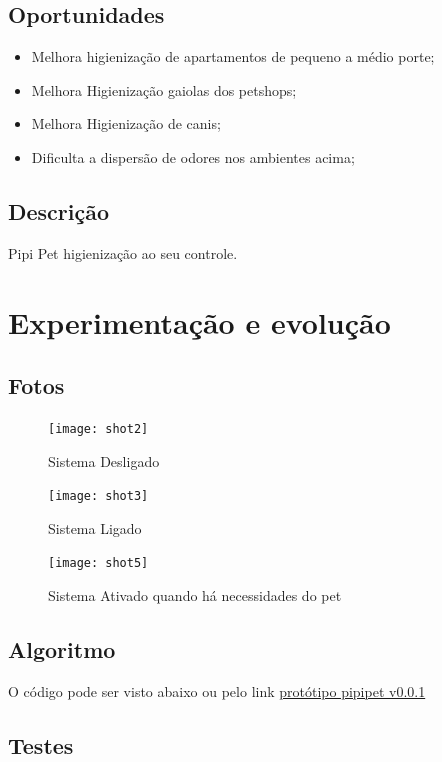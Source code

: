 \documentclass[12pt,a4paper]{article}
\let\oldsection\section
\renewcommand\section{\clearpage\oldsection}
\begin{document}
\subsection{Oportunidades}
\begin{itemize}
	\item Melhora higienização de apartamentos de pequeno a médio porte;
	\item Melhora Higienização gaiolas dos petshops;
	\item Melhora Higienização de canis;
	\item Dificulta a dispersão de odores nos ambientes acima;
\end{itemize}

\subsection{Descrição}
Pipi Pet higienização ao seu controle.

%
%
\section{Experimentação e evolução}
\subsection{Fotos}
\begin{figure}[htb!]
	\centering
	\texttt{[image: shot2]}
	\caption{Sistema Desligado}
	\label{fig:desligado}
\end{figure}

\begin{figure}[htb!]
	\centering
	\texttt{[image: shot3]}
	\caption{Sistema Ligado}
	\label{fig:ligado}
\end{figure}

\begin{figure}[htb!]
	\centering
	\texttt{[image: shot5]}
	\caption{Sistema Ativado quando há necessidades do pet}
	\label{fig:necessidades}
\end{figure}

\newpage

\subsection{Algoritmo}
O código pode ser visto abaixo ou pelo link \href{
	https://www.tinkercad.com/things/9dnCu8UsG4O}{protótipo pipipet v0.0.1}


\subsection{Testes}
\end{document}
